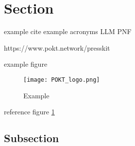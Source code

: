 \section{Section}\label{sec:section}
example cite \cite{poktscan_open_nodate} \cite{gao_framework_2023}
example acronyms \gls{LLM} \gls{PNF}


https://www.pokt.network/presskit

example figure

\begin{figure}[H]
    \centering
    \texttt{[image: POKT\_logo.png]}
    \caption{Example}
    \label{fig:example}
\end{figure}

reference figure \ref{fig:example}

\subsection{Subsection}


